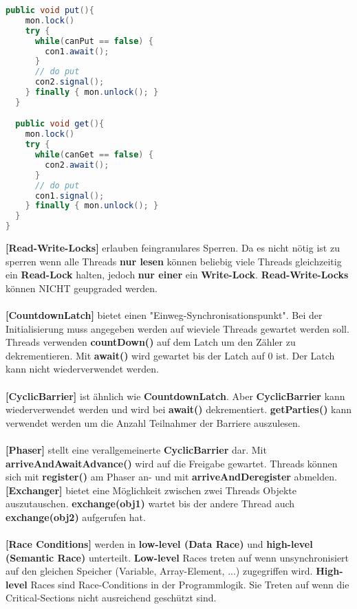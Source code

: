 \documentclass[8pt]{extarticle}
\let\oldtextbf\textbf
\renewcommand{\textbf}{\tiny\oldtextbf}
\begin{document}
\begin{multicols*}{5}
\begin{lstlisting}[language=java]
  public void put(){
    mon.lock()
    try {
      while(canPut == false) {
        con1.await();
      }
      // do put
      con2.signal();
    } finally { mon.unlock(); }
  }

  public void get(){
    mon.lock()
    try {
      while(canGet == false) {
        con2.await();
      }
      // do put
      con1.signal();
    } finally { mon.unlock(); }
  }
}
\end{lstlisting}
\textbf{[Read-Write-Locks]} erlauben feingranulares Sperren. Da es nicht nötig ist zu sperren wenn alle Threads \textbf{nur lesen} können beliebig viele Threads gleichzeitig ein \textbf{Read-Lock} halten, jedoch \textbf{nur einer} ein \textbf{Write-Lock}. \textbf{Read-Write-Locks} können NICHT geupgraded werden.\\\\
\textbf{[CountdownLatch]} bietet einen "Einweg-Synchronisationspunkt". Bei der Initialisierung muss angegeben werden auf wieviele Threads gewartet werden soll. Threads verwenden \textbf{countDown()} auf dem Latch um den Zähler zu dekrementieren. Mit \textbf{await()} wird gewartet bis der Latch auf 0 ist. Der Latch kann nicht wiederverwendet werden.\\\\
\textbf{[CyclicBarrier]} ist ähnlich wie \textbf{CountdownLatch}. Aber \textbf{CyclicBarrier} kann wiederverwendet werden und wird bei \textbf{await()} dekrementiert. \textbf{getParties()} kann verwendet werden um die Anzahl Teilnahmer der Barriere auszulesen.\\\\
\textbf{[Phaser]} stellt eine verallgemeinerte \textbf{CyclicBarrier} dar. Mit \textbf{arriveAndAwaitAdvance()} wird auf die Freigabe gewartet. Threads können sich mit \textbf{register()} am Phaser an- und mit \textbf{arriveAndDeregister} abmelden.\\
\textbf{[Exchanger]} bietet eine Möglichkeit zwischen zwei Threads Objekte auszutauschen. \textbf{exchange(obj1)} wartet bis der andere Thread auch \textbf{exchange(obj2)} aufgerufen hat.\\\\
\textbf{[Race Conditions]} werden in \textbf{low-level (Data Race)} und \textbf{high-level (Semantic Race)} unterteilt. \textbf{Low-level} Races treten auf wenn unsynchronisiert auf den gleichen Speicher (Variable, Array-Element, ...) zugegriffen wird. \textbf{High-level} Races sind Race-Conditions in der Programmlogik. Sie Treten auf wenn die Critical-Sections nicht ausreichend geschützt sind.\\\\

\end{multicols*}
\end{document}

